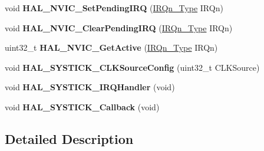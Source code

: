\begin{DoxyCompactItemize}
\item 
void {\bfseries H\+A\+L\+\_\+\+N\+V\+I\+C\+\_\+\+Set\+Pending\+I\+RQ} (\hyperlink{group___peripheral__interrupt__number__definition_ga7e1129cd8a196f4284d41db3e82ad5c8}{I\+R\+Qn\+\_\+\+Type} I\+R\+Qn)\hypertarget{group___c_o_r_t_e_x___exported___functions___group2_gaecf50f6c6d0e1fa5f8bd8c1b45309f18}{}\label{group___c_o_r_t_e_x___exported___functions___group2_gaecf50f6c6d0e1fa5f8bd8c1b45309f18}

\item 
void {\bfseries H\+A\+L\+\_\+\+N\+V\+I\+C\+\_\+\+Clear\+Pending\+I\+RQ} (\hyperlink{group___peripheral__interrupt__number__definition_ga7e1129cd8a196f4284d41db3e82ad5c8}{I\+R\+Qn\+\_\+\+Type} I\+R\+Qn)\hypertarget{group___c_o_r_t_e_x___exported___functions___group2_ga0c7d007acf1339ca1bb46f3c6e018ff5}{}\label{group___c_o_r_t_e_x___exported___functions___group2_ga0c7d007acf1339ca1bb46f3c6e018ff5}

\item 
uint32\+\_\+t {\bfseries H\+A\+L\+\_\+\+N\+V\+I\+C\+\_\+\+Get\+Active} (\hyperlink{group___peripheral__interrupt__number__definition_ga7e1129cd8a196f4284d41db3e82ad5c8}{I\+R\+Qn\+\_\+\+Type} I\+R\+Qn)\hypertarget{group___c_o_r_t_e_x___exported___functions___group2_gad3f7598e54fb3d74eaf9abedef704c57}{}\label{group___c_o_r_t_e_x___exported___functions___group2_gad3f7598e54fb3d74eaf9abedef704c57}

\item 
void {\bfseries H\+A\+L\+\_\+\+S\+Y\+S\+T\+I\+C\+K\+\_\+\+C\+L\+K\+Source\+Config} (uint32\+\_\+t C\+L\+K\+Source)\hypertarget{group___c_o_r_t_e_x___exported___functions___group2_ga3284dc8428996f5b6aa6b3b99e643788}{}\label{group___c_o_r_t_e_x___exported___functions___group2_ga3284dc8428996f5b6aa6b3b99e643788}

\item 
void {\bfseries H\+A\+L\+\_\+\+S\+Y\+S\+T\+I\+C\+K\+\_\+\+I\+R\+Q\+Handler} (void)\hypertarget{group___c_o_r_t_e_x___exported___functions___group2_ga5b66b62383261c1e0acef98d344aa4c1}{}\label{group___c_o_r_t_e_x___exported___functions___group2_ga5b66b62383261c1e0acef98d344aa4c1}

\item 
void {\bfseries H\+A\+L\+\_\+\+S\+Y\+S\+T\+I\+C\+K\+\_\+\+Callback} (void)\hypertarget{group___c_o_r_t_e_x___exported___functions___group2_ga5033855e81ba2071231b60599a3ce9a1}{}\label{group___c_o_r_t_e_x___exported___functions___group2_ga5033855e81ba2071231b60599a3ce9a1}

\end{DoxyCompactItemize}


\subsection{Detailed Description}
